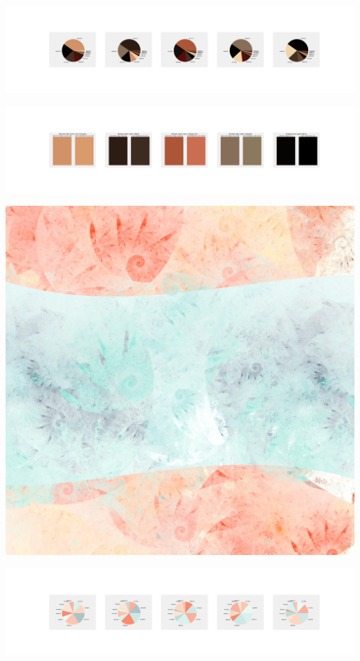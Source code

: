 \documentclass[11pt]{article}
\begin{document}
\begin{landscape}
    \begin{center}
    \includegraphics[width=250mm]{./nbimg/pie-334.jpg}
    \end{center}

    \begin{center}
    \includegraphics[width=250mm]{./nbimg/peak-334.jpg}
    \end{center}
    

    \begin{center}
    \includegraphics[width=\textwidth]{./nbimg/file (400).jpg}
    \end{center}

    \begin{center}
    \includegraphics[width=250mm]{./nbimg/pie-335.jpg}
    \end{center}


\end{landscape}
\end{document}
